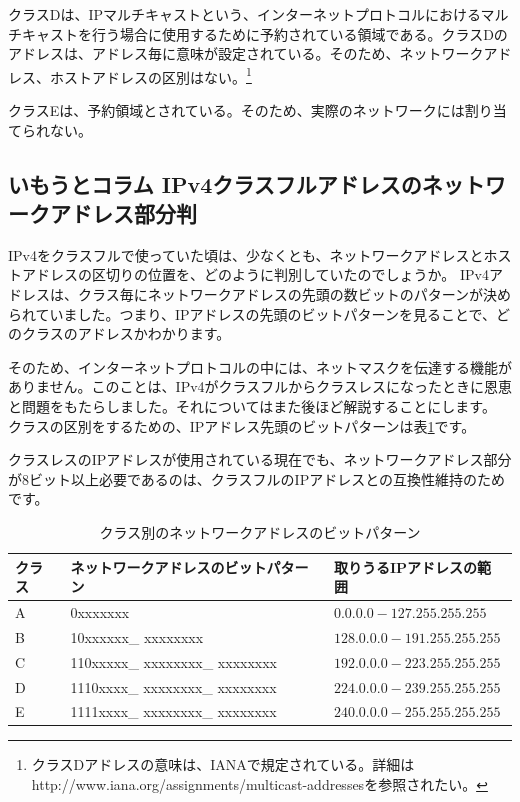 クラスDは、IPマルチキャストという、インターネットプロトコルにおけるマルチキャストを行う場合に使用するために予約されている領域である。クラスDのアドレスは、アドレス毎に意味が設定されている。そのため、ネットワークアドレス、ホストアドレスの区別はない。\footnote{クラスDアドレスの意味は、IANAで規定されている。詳細はhttp://www.iana.org/assignments/multicast-addressesを参照されたい。}

クラスEは、予約領域とされている。そのため、実際のネットワークには割り当てられない。

\subsection*{いもうとコラム IPv4クラスフルアドレスのネットワークアドレス部分判}

IPv4をクラスフルで使っていた頃は、少なくとも、ネットワークアドレスとホストアドレスの区切りの位置を、どのように判別していたのでしょうか。
IPv4アドレスは、クラス毎にネットワークアドレスの先頭の数ビットのパターンが決められていました。つまり、IPアドレスの先頭のビットパターンを見ることで、どのクラスのアドレスかわかります。

そのため、インターネットプロトコルの中には、ネットマスクを伝達する機能がありません。このことは、IPv4がクラスフルからクラスレスになったときに恩恵と問題をもたらしました。それについてはまた後ほど解説することにします。
クラスの区別をするための、IPアドレス先頭のビットパターンは表\ref{bitpattern}です。

クラスレスのIPアドレスが使用されている現在でも、ネットワークアドレス部分が8ビット以上必要であるのは、クラスフルのIPアドレスとの互換性維持のためです。


\begin{table}[hbtp] \caption{クラス別のネットワークアドレスのビットパターン} \label{bitpattern}
\begin{center}
\begin{tabularx}{110mm}{lll} \toprule
クラス & ネットワークアドレスのビットパターン & 取りうるIPアドレスの範囲\\ \midrule
A & 0xxxxxxx & $0.0.0.0-127.255.255.255$\\
B & 10xxxxxx\_ xxxxxxxx & $128.0.0.0-191.255.255.255$\\
C & 110xxxxx\_ xxxxxxxx\_ xxxxxxxx & $192.0.0.0-223.255.255.255$\\
D & 1110xxxx\_ xxxxxxxx\_ xxxxxxxx & $224.0.0.0-239.255.255.255$\\
E & 1111xxxx\_ xxxxxxxx\_ xxxxxxxx & $240.0.0.0-255.255.255.255$\\ \bottomrule
\end{tabularx}
\end{center}
\end{table}


